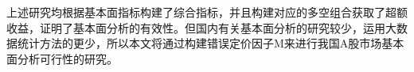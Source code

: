 上述研究均根据基本面指标构建了综合指标，并且构建对应的多空组合获取了超额收益，证明了基本面分析的有效性。但国内有关基本面分析的研究较少，运用大数据统计方法的更少，所以本文将通过构建错误定价因子M来进行我国A股市场基本面分析可行性的研究。


%
%
%
%
%
%
